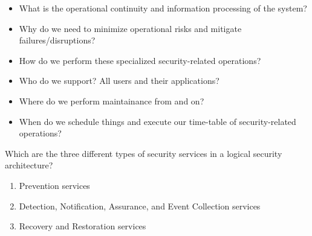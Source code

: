 \begin{questions}
\begin{parts}
\begin{solution}
\begin{enumerate}[noitemsep]
\begin{itemize}[noitemsep]
        \item What is the operational continuity and information processing of the system?
        \item Why do we need to minimize operational risks and mitigate failures/disruptions?
        \item How do we perform these specialized security-related operations?
        \item Who do we support? All users and their applications?
        \item Where do we perform maintainance from and on?
        \item When do we schedule things and execute our time-table of security-related operations?
        \end{itemize}
      \end{enumerate}
    \end{solution}
  \end{parts}

\question{} Which are the three different types of security services in a logical security architecture?
  \begin{solution}
    \begin{enumerate}[noitemsep]
    \item Prevention services
    \item Detection, Notification, Assurance, and Event Collection services
    \item Recovery and Restoration services
    \end{enumerate}
  \end{solution}

  \begin{parts}

\end{parts}
\end{questions}
